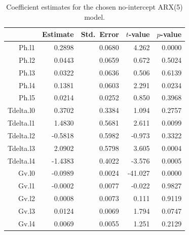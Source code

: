 \begin{table}[ht]
\centering
\caption{Coefficient estimates for the chosen no-intercept ARX(5) model.} 
\label{tab:arx5_coef}
\begin{tabular}{rrrrr}
  \toprule
 & Estimate & Std.\ Error & $t$-value & $p$-value \\ 
  \midrule
Ph.l1 & 0.2898 & 0.0680 & 4.262 & 0.0000 \\ 
  Ph.l2 & 0.0443 & 0.0659 & 0.672 & 0.5024 \\ 
  Ph.l3 & 0.0322 & 0.0636 & 0.506 & 0.6139 \\ 
  Ph.l4 & 0.1381 & 0.0603 & 2.291 & 0.0234 \\ 
  Ph.l5 & 0.0214 & 0.0252 & 0.850 & 0.3968 \\ 
  Tdelta.l0 & 0.3702 & 0.3384 & 1.094 & 0.2757 \\ 
  Tdelta.l1 & 1.4830 & 0.5681 & 2.611 & 0.0099 \\ 
  Tdelta.l2 & -0.5818 & 0.5982 & -0.973 & 0.3322 \\ 
  Tdelta.l3 & 2.0902 & 0.5798 & 3.605 & 0.0004 \\ 
  Tdelta.l4 & -1.4383 & 0.4022 & -3.576 & 0.0005 \\ 
  Gv.l0 & -0.0989 & 0.0024 & -41.027 & 0.0000 \\ 
  Gv.l1 & -0.0002 & 0.0077 & -0.022 & 0.9827 \\ 
  Gv.l2 & 0.0008 & 0.0073 & 0.111 & 0.9119 \\ 
  Gv.l3 & 0.0124 & 0.0069 & 1.794 & 0.0747 \\ 
  Gv.l4 & 0.0069 & 0.0055 & 1.251 & 0.2129 \\ 
   \bottomrule
\end{tabular}
\end{table}
